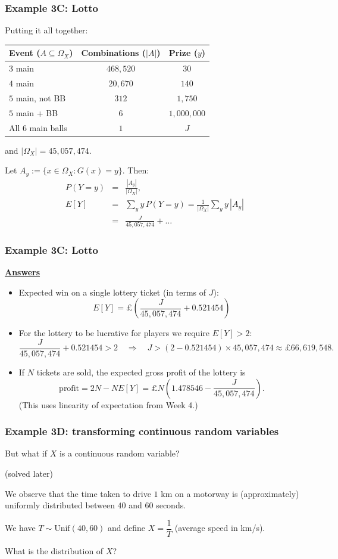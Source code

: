 \documentclass[t,8pt]{beamer}
\begin{document}
\begin{frame}
	\frametitle{Example 3C: Lotto}
	Putting it all together:
	\begin{table}
		\centering
		\begin{tabular}{|l|c|c|}
			\hline 
			Event ($A\subseteq\Omega_X$) & Combinations ($|A|$) & Prize ($y$) \\ \hline
			$3$ main & $468{,}520$ & $30$\\
			$4$ main & $20{,}670$ & $140$\\
			$5$ main, not BB & $312$ & $1{,}750$\\
			$5$ main + BB & $6$ & $1{,}000{,}000$\\
			All $6$ main balls & $1$ & $J$ \\ \hline
		\end{tabular}
	\end{table}
	and $|\Omega_X|=45{,}057{,}474$. \par
	Let $A_y:=\{x\in\Omega_X: G(x)=y\}$. Then:
	\begin{eqnarray*}
		P(Y=y)&=&\frac{|A_y|}{|\Omega_X|},\\[3pt]
		E[Y]&=&\sum_y y\,P(Y=y)
		=\frac 1{|\Omega_X|}\sum_y y\,|A_y|\\
		&=&\frac J{45{,}057{,}474}+\dots
	\end{eqnarray*}
\end{frame}

\begin{frame}
	\frametitle{Example 3C: Lotto}
	{\bf\underline{Answers}} \par
	\begin{itemize}
		\item Expected win on a single lottery ticket (in terms of $J$):
		\[
		\boxed{E[Y]=\pounds\left(\frac{J}{45{,}057{,}474}+0.521454\right)}
		\]
		\item For the lottery to be lucrative for players we require $E[Y]>2$:
		\[
		\frac{J}{45{,}057{,}474}+0.521454>2
		\quad\Rightarrow\quad
		J>(2-0.521454)\times 45{,}057{,}474
		\approx \boxed{\pounds 66{,}619{,}548}.
		\]
		\item If $N$ tickets are sold, the expected gross profit of the lottery is
		\[
		\text{profit}=2N - N E[Y]
		=\pounds N\left(1.478546-\frac{J}{45{,}057{,}474}\right).
		\]
		(This uses linearity of expectation from Week 4.)
	\end{itemize}
\end{frame}

\begin{frame}
	\frametitle{Example 3D: transforming continuous random variables}
	But what if $X$ is a continuous random variable? \par
	(solved later) \par 
	We observe that the time taken to drive $1$ km on a motorway is (approximately) uniformly distributed between $40$ and $60$ seconds. \par
	We have $T\sim \mathrm{Unif}(40,60)$ and define $X=\dfrac 1T$ (average speed in km/s). \par 
	What is the distribution of $X$?
\end{frame}
\end{document}
